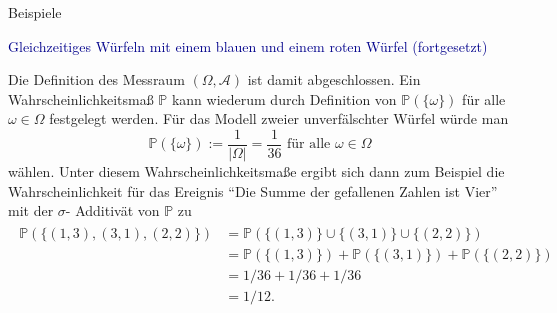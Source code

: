 \documentclass[
  8pt,
  ignorenonframetext,
]{beamer}
\begin{document}
\begin{frame}{Beispiele}
\protect\hypertarget{beispiele-4}{}
\small

\textcolor{darkblue}{Gleichzeitiges Würfeln mit einem blauen und einem roten Würfel (fortgesetzt)}
\footnotesize

Die Definition des Messraum \((\Omega, \mathcal{A})\) ist damit
abgeschlossen. Ein Wahrscheinlichkeitsmaß \(\mathbb{P}\) kann wiederum
durch Definition von \(\mathbb{P}(\{\omega\})\) für alle
\(\omega \in \Omega\) festgelegt werden. Für das Modell zweier
unverfälschter Würfel würde man \begin{equation}
\mathbb{P}(\{\omega\}) := \frac{1}{|\Omega|} = \frac{1}{36} \mbox{ für alle } \omega \in \Omega
\end{equation} wählen. Unter diesem Wahrscheinlichkeitsmaße ergibt sich
dann zum Beispiel die Wahrscheinlichkeit für das Ereignis ``Die Summe
der gefallenen Zahlen ist Vier'' mit der \(\sigma\)- Additivät von
\(\mathbb{P}\) zu \begin{align*}
\begin{split}
\mathbb{P}\left(\{(1,3),(3,1),(2,2)\}\right)
& = \mathbb{P}\left(\{(1,3)\}\cup \{(3,1)\} \cup \{(2,2)\}\right) \\
& = \mathbb{P}\left(\{(1,3)\}\right)
  + \mathbb{P}\left(\{(3,1)\}\right)
  + \mathbb{P}\left(\{(2,2)\}\right) \\
& = 1/36 + 1/36 + 1/36                  \\
& = 1/12.
\end{split}
\end{align*} \vfill
\end{frame}
\end{document}
